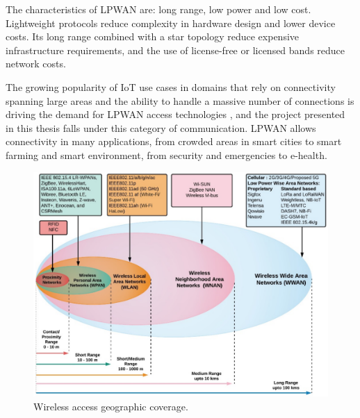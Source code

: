 		The characteristics of LPWAN are: long range, low power and low cost.
		Lightweight protocols reduce complexity in hardware design and lower device costs. Its long range combined with a star topology reduce expensive infrastructure requirements, and the use of license-free or licensed bands reduce network costs.
	
		The growing popularity of IoT use cases in domains that rely on connectivity spanning large areas and the ability to handle a massive number of connections is driving the demand for LPWAN access technologies \cite{fi12030046}, and the project presented in this thesis falls under this category of communication.
		LPWAN allows connectivity in many applications, from crowded areas in smart cities to smart farming and smart environment, from security and emergencies to e-health.
		
		\begin{figure}
			\centering
			\includegraphics[width=\textheight,height=\textwidth,keepaspectratio,angle=90]{resources/img/chap3/iot_range}
			\caption[Wireless access geographic coverage.]{Wireless access geographic coverage. \cite{fi12030046}}
			\label{img:wireless_coverage}
		\end{figure}
		
